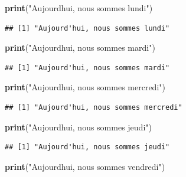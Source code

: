 \documentclass[
]{book}
\newenvironment{Shaded}{\begin{snugshade}}{\end{snugshade}}
\newcommand{\FunctionTok}[1]{\textcolor[rgb]{0.13,0.29,0.53}{\textbf{#1}}}
\newcommand{\NormalTok}[1]{#1}
\newcommand{\StringTok}[1]{\textcolor[rgb]{0.31,0.60,0.02}{#1}}
\begin{document}
\begin{Shaded}
\begin{Highlighting}[]
\FunctionTok{print}\NormalTok{(}\StringTok{"Aujourd\textquotesingle{}hui, nous sommes lundi"}\NormalTok{)}
\end{Highlighting}
\end{Shaded}

\begin{verbatim}
## [1] "Aujourd'hui, nous sommes lundi"
\end{verbatim}

\begin{Shaded}
\begin{Highlighting}[]
\FunctionTok{print}\NormalTok{(}\StringTok{"Aujourd\textquotesingle{}hui, nous sommes mardi"}\NormalTok{)}
\end{Highlighting}
\end{Shaded}

\begin{verbatim}
## [1] "Aujourd'hui, nous sommes mardi"
\end{verbatim}

\begin{Shaded}
\begin{Highlighting}[]
\FunctionTok{print}\NormalTok{(}\StringTok{"Aujourd\textquotesingle{}hui, nous sommes mercredi"}\NormalTok{)}
\end{Highlighting}
\end{Shaded}

\begin{verbatim}
## [1] "Aujourd'hui, nous sommes mercredi"
\end{verbatim}

\begin{Shaded}
\begin{Highlighting}[]
\FunctionTok{print}\NormalTok{(}\StringTok{"Aujourd\textquotesingle{}hui, nous sommes jeudi"}\NormalTok{)}
\end{Highlighting}
\end{Shaded}

\begin{verbatim}
## [1] "Aujourd'hui, nous sommes jeudi"
\end{verbatim}

\begin{Shaded}
\begin{Highlighting}[]
\FunctionTok{print}\NormalTok{(}\StringTok{"Aujourd\textquotesingle{}hui, nous sommes vendredi"}\NormalTok{)}
\end{Highlighting}
\end{Shaded}
\end{document}
